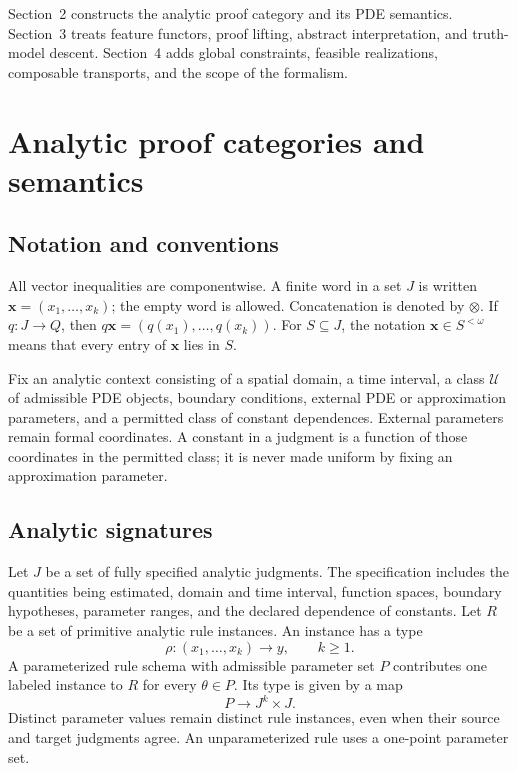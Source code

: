 \documentclass[10pt,journal,a4paper]{IEEEtran}
\theoremstyle{definition}
\begin{document}
Section~2 constructs the analytic proof category and its PDE semantics. Section~3 treats feature functors, proof lifting, abstract interpretation, and truth-model descent. Section~4 adds global constraints, feasible realizations, composable transports, and the scope of the formalism.

\section{Analytic proof categories and semantics}

\subsection{Notation and conventions}

All vector inequalities are componentwise. A finite word in a set $J$ is written $\mathbf x=(x_1,\ldots,x_k)$; the empty word is allowed. Concatenation is denoted by $\otimes$. If $q:J\to Q$, then $q\mathbf x=(q(x_1),\ldots,q(x_k))$. For $S\subseteq J$, the notation $\mathbf x\in S^{<\omega}$ means that every entry of $\mathbf x$ lies in $S$.

Fix an analytic context consisting of a spatial domain, a time interval, a class $\mathcal U$ of admissible PDE objects, boundary conditions, external PDE or approximation parameters, and a permitted class of constant dependences. External parameters remain formal coordinates. A constant in a judgment is a function of those coordinates in the permitted class; it is never made uniform by fixing an approximation parameter.

\subsection{Analytic signatures}

Let $J$ be a set of fully specified analytic judgments. The specification includes the quantities being estimated, domain and time interval, function spaces, boundary hypotheses, parameter ranges, and the declared dependence of constants. Let $R$ be a set of primitive analytic rule instances. An instance has a type
\[
  \rho:(x_1,\ldots,x_k)\longrightarrow y,
  \qquad k\geq1.
\]
A parameterized rule schema with admissible parameter set $P$ contributes one labeled instance to $R$ for every $\theta\in P$. Its type is given by a map
\[
  P\longrightarrow J^k\times J.
\]
Distinct parameter values remain distinct rule instances, even when their source and target judgments agree. An unparameterized rule uses a one-point parameter set.
\end{document}
